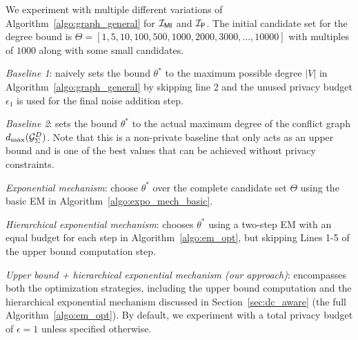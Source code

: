   We experiment with multiple different variations of Algorithm~\ref{algo:graph_general} for $\mathcal{I_{\mathsf{MI}}}$ and $\mathcal{I_\mathsf{P}}$. The initial candidate set for the degree bound is $\Theta = [1, 5, 10, 100, 500, 1000, 2000, 3000, \dots, 10000]$ with multiples of $1000$ along with some small candidates.
\squishlist
    \item \textit{Baseline 1}: naively sets the bound $\theta^*$ to the maximum possible degree $|V|$ in Algorithm~\ref{algo:graph_general} by skipping line 2 and the unused privacy budget $\epsilon_1$ is used for the final noise addition step. 
    \item \textit{Baseline 2}: sets the bound $\theta^*$ to the actual maximum degree of the conflict graph  $d_{\max}({\mathcal{G}_{{\Sigma}}^{D}})$. Note that this is a non-private baseline that only acts as an upper bound and is one of the best values that can be achieved without privacy constraints. 
    \item \textit{Exponential mechanism}: choose $\theta^*$ over the complete candidate set $\Theta$ using the basic EM in  Algorithm~\ref{algo:expo_mech_basic}.
    \item \textit{Hierarchical exponential mechanism}: chooses $\theta^*$ using a two-step EM with an equal budget for each step in Algorithm~\ref{algo:em_opt}, but skipping Lines 1-5 of the upper bound computation step.  
    \item \textit{Upper bound + hierarchical exponential mechanism (our approach)}: encompasses both the optimization strategies, including 
    the upper bound computation and the hierarchical exponential mechanism
    discussed in Section~\ref{sec:dc_aware} (the full Algorithm~\ref{algo:em_opt}). 
\squishend
By default, we experiment with a total privacy budget of $\epsilon=1$ unless specified otherwise. 
